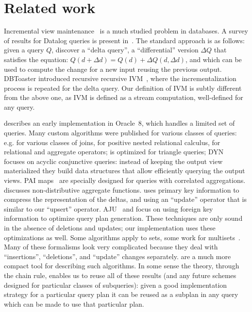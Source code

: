 \section{Related work}\label{sec:related}

Incremental view
maintenance~\cite{buneman-actd79,blakeley-sigmod86,gupta-sigmod93,chaudhuri-icde95,gupta-idb95,chirkova-book12}
is a much studied problem in databases.  A survey of results for
Datalog queries is present in~\cite{motik-ai19}.  The standard
approach is as follows: given a query $Q$, discover a ``delta query'',
a ``differential'' version $\Delta Q$ that satisfies the equation:
$Q(d+\Delta d)=Q(d)+\Delta Q(d,\Delta d)$, and which can be used to
compute the change for a new input reusing the previous output.
DBToaster introduced recursive recursive
IVM~\cite{ahmad-vldb09,koch-pods10,nikolic-sigmod16}, where the
incrementalization process is repeated for the delta query.  Our
definition of IVM is subtly different from the above one, as IVM is
defined as a stream computation, well-defined for any query.

\cite{bello-vldb98} describes an early implementation in Oracle~8,
which handles a limited set of queries.  Many custom algorithms were
published for various classes of queries:
e.g. \cite{griffin-sigmod98,larson-icde07} for various classes of
joins, \cite{koch-pods16} for positive nested relational calculus,
\cite{gupta-infsys06} for relational and aggregate operators;
\cite{kara-tds20} is optimized for triangle queries;
DYN~\cite{idris-sigmod17,idris-vldb18,idris-sigmod19} focuses on
acyclic conjunctive queries: instead of keeping the output view
materialized they build data structures that allow efficiently
querying the output views.  PAI maps~\cite{abeysinghe-sigmod22} are
specially designed for queries with correlated aggregations.
\cite{palpanas-vldb02} discusses non-distributive aggregate functions.
\cite{katsis-sigmod15} uses primary key information to compress the
representation of the deltas, and using an ``update'' operator that is
similar to our ``upsert'' operator.  AJU~\cite{wang-sigmod20} and
\cite{svingos-amd23} focus on using foreign key information to
optimize query plan generation.  These techniques are only sound in
the absence of deletions and updates; our implementation uses these
optimizations as well.  Some algorithms apply to sets, some work for
multisets~\cite{griffin-sigmod95}.  Many of these formalisms look very
complicated because they deal with ``insertions'', ``deletions'', and
``update'' changes separately.  \zrs are a much more compact tool for
describing such algorithms.  In some sense the \dbsp theory, through
the chain rule, enables us to reuse all of these results (and any
future schemes designed for particular classes of subqueries): given a
good implementation strategy for a particular query plan it can be
reused as a subplan in any query which can be made to use that
particular plan.


